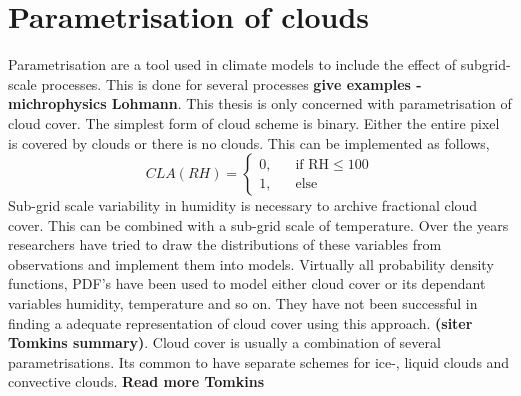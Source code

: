 \section{Parametrisation of clouds} \label{sec:param_clouds}
Parametrisation are a tool used in climate models to include the effect of subgrid-scale processes. This is done for several processes \textbf{give examples - michrophysics Lohmann}. This thesis is only concerned with parametrisation of cloud cover. The simplest form of cloud scheme is binary. Either the entire pixel is covered by clouds or there is no clouds. This can be implemented as follows,
\begin{equation} \label{eq:binary_param_clouds}
    CLA\left(RH\right) = 
     \begin{cases}
       \text{0,} &\quad\text{if RH}\le100\\
       \text{1,} &\quad\text{else}
     \end{cases}
\end{equation}
Sub-grid scale variability in humidity is necessary to archive fractional cloud cover. This can be combined with a sub-grid scale of temperature. Over the years researchers have tried to draw the distributions of these variables from observations and implement them into models. Virtually all probability density functions, PDF's have been used to model either cloud cover or its dependant variables humidity, temperature and so on. They have not been successful in finding a adequate representation of cloud cover using this approach. \textbf{(siter Tomkins summary)}. Cloud cover is usually a combination of several parametrisations. Its common to have separate schemes for ice-, liquid clouds and convective clouds. \textbf{Read more Tomkins}
\\ \\ 
